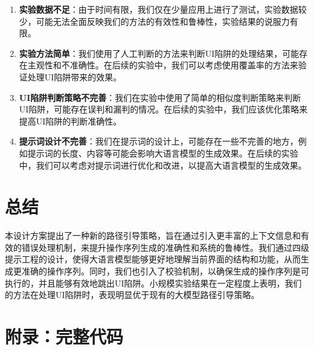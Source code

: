 \documentclass{article}
\begin{document}
\begin{enumerate}
    \item \textbf{实验数据不足}：由于时间有限，我们仅在少量应用上进行了测试，实验数据较少，可能无法全面反映我们的方法的有效性和鲁棒性，实验结果的说服力有限。
    \item \textbf{实验方法简单}：我们使用了人工判断的方法来判断UI陷阱的处理结果，可能存在主观性和不准确性。在后续的实验中，我们可以考虑使用覆盖率的方法来验证处理UI陷阱带来的效果。
    \item \textbf{UI陷阱判断策略不完善}：我们在实验中使用了简单的相似度判断策略来判断UI陷阱，可能存在误判和漏判的情况。在后续的实验中，我们应该优化策略来提高UI陷阱的判断准确性。
    \item \textbf{提示词设计不完善}：我们在提示词的设计上，可能存在一些不完善的地方，例如提示词的长度、内容等可能会影响大语言模型的生成效果。在后续的实验中，我们可以考虑对提示词进行优化和改进，以提高大语言模型的生成效果。
\end{enumerate}

\section{总结}

本设计方案提出了一种新的路径引导策略，旨在通过引入更丰富的上下文信息和有效的错误处理机制，来提升操作序列生成的准确性和系统的鲁棒性。我们通过四级提示工程的设计，使得大语言模型能够更好地理解当前界面的结构和功能，从而生成更准确的操作序列。同时，我们也引入了校验机制，以确保生成的操作序列是可执行的，并且能够有效地跳出UI陷阱。小规模实验结果在一定程度上表明，我们的方法在处理UI陷阱时，表现明显优于现有的大模型路径引导策略。

\appendix

\section{附录：完整代码}
\end{document}
